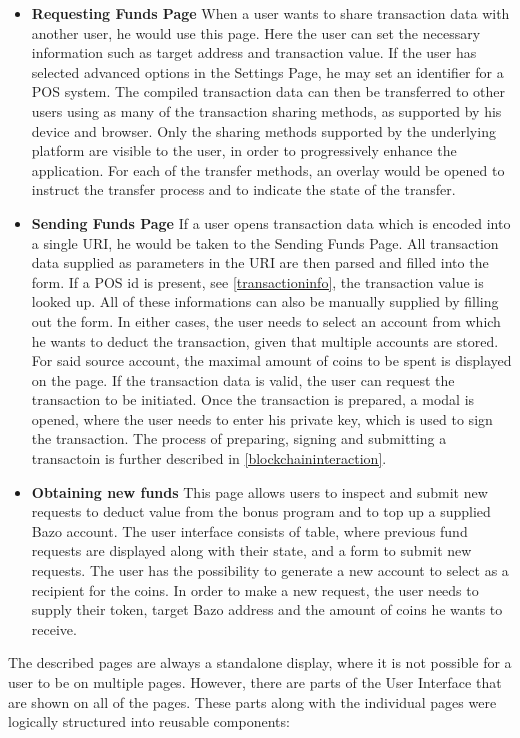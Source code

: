 \begin{itemize}
\item \textbf{Requesting Funds Page}
When a user wants to share transaction data with another user, he would use this page. Here the user can set the necessary information such as target address and transaction value. If the user has selected advanced options in the Settings Page, he may set an identifier for a POS system. 
The compiled transaction data can then be transferred to other users using as many of the transaction sharing methods, as supported by his device and browser. Only the sharing methods supported by the underlying platform are visible to the user, in order to progressively enhance the application. For each of the transfer methods, an overlay would be opened to instruct the transfer process and to indicate the state of the transfer.
\item \textbf{Sending Funds Page}
If a user opens transaction data which is encoded into a single URI, he would be taken to the Sending Funds Page.
All transaction data supplied as parameters in the URI are then parsed and filled into the form. If a POS id is present, see \ref{transactioninfo}, the transaction value is looked up. All of these informations can also be manually supplied by filling out the form. In either cases, the user needs to select an account from which he wants to deduct the transaction, given that multiple accounts are stored. For said source account, the maximal amount of coins to be spent is displayed on the page. If the transaction data is valid, the user can request the transaction to be initiated. Once the transaction is prepared, a modal is opened, where the user needs to enter his private key, which is used to sign the transaction. The process of preparing, signing and submitting a transactoin is further described in \ref{blockchaininteraction}.
\item \textbf{Obtaining new funds}
This page allows users to inspect and submit new requests to deduct value from the bonus program and to top up a supplied Bazo account.
The user interface consists of table, where previous fund requests are displayed along with their state, and a form to submit new requests. The user has the possibility to generate a new account to select as a recipient for the coins. In order to make a new request, the user needs to supply their token, target Bazo address and the amount of coins he wants to receive. 
\end{itemize}
The described pages are always a standalone display, where it is not possible for a user to be on multiple pages. However, there are parts of the User Interface that are shown on all of the pages. These parts along with the individual pages were logically structured into reusable components:
